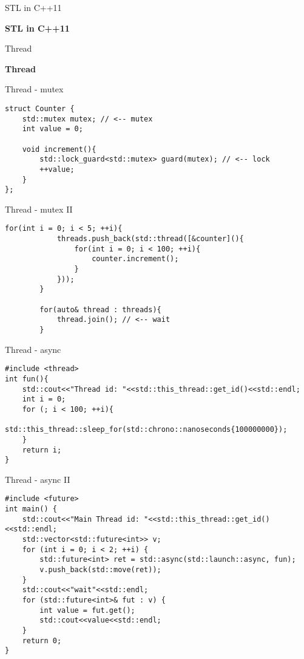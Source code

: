 \documentclass{beamer}
\begin{document}
\begin{frame}[fragile]{STL in C++11} 
\begin{center}
{\Huge \textbf{STL in C++11}}
\end{center}
\end{frame}

\begin{frame}[fragile]{Thread}
\begin{center}
{\Huge \textbf{Thread}}
\end{center}
\end{frame}

\begin{frame}[fragile]{Thread - mutex} 
\begin{lstlisting}[style=customcpp]
struct Counter {
    std::mutex mutex; // <-- mutex
    int value = 0;

    void increment(){
        std::lock_guard<std::mutex> guard(mutex); // <-- lock
        ++value;
    }
};

\end{lstlisting}
\end{frame}

\begin{frame}[fragile]{Thread - mutex II} 
\begin{lstlisting}[style=customcpp]
 for(int i = 0; i < 5; ++i){
	        threads.push_back(std::thread([&counter](){
	            for(int i = 0; i < 100; ++i){
	                counter.increment();
	            }
	        }));
	    }

	    for(auto& thread : threads){
	        thread.join(); // <-- wait
	    }
\end{lstlisting}
\end{frame}

\begin{frame}[fragile]{Thread - async} 
\begin{lstlisting}[style=customcpp]
#include <thread>
int fun(){
	std::cout<<"Thread id: "<<std::this_thread::get_id()<<std::endl;
	int i = 0;
	for (; i < 100; ++i){
		std::this_thread::sleep_for(std::chrono::nanoseconds{100000000});
	}
	return i;
}
\end{lstlisting}
\end{frame}

\begin{frame}[fragile]{Thread - async II} 
\begin{lstlisting}[style=customcpp]
#include <future>
int main() {
	std::cout<<"Main Thread id: "<<std::this_thread::get_id()<<std::endl;
	std::vector<std::future<int>> v;
	for (int i = 0; i < 2; ++i) {
		std::future<int> ret = std::async(std::launch::async, fun);
		v.push_back(std::move(ret));
	}
	std::cout<<"wait"<<std::endl;
	for (std::future<int>& fut : v) {
		int value = fut.get();
		std::cout<<value<<std::endl;
	}
	return 0;
}
\end{lstlisting}
\end{frame}
\end{document}
